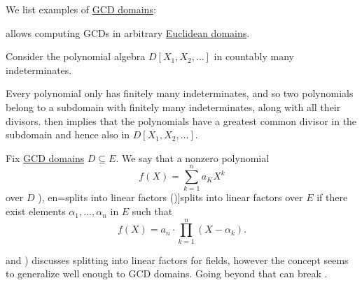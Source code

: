 \begin{example}\label{ex:def:gcd_domain}
  We list examples of \hyperref[def:gcd_domain]{GCD domains}:
  \begin{thmenum}
      allows computing GCDs in arbitrary \hyperref[def:euclidean_domain]{Euclidean domains}.

     Consider the polynomial algebra \( D[X_1, X_2, \ldots] \) in countably many indeterminates.

    Every polynomial only has finitely many indeterminates, and so two polynomials belong to a subdomain with finitely many indeterminates, along with all their divisors.  then implies that the polynomials have a greatest common divisor in the subdomain and hence also in \( D[X_1, X_2, \ldots] \).
  \end{thmenum}
\end{example}

\begin{definition}\label{def:polynomial_splits_into_linear_factors}\mimprovised
  Fix \hyperref[def:gcd_domain]{GCD domains} \( D \subseteq E \). We say that a nonzero polynomial
  \begin{equation*}
    f(X) = \sum_{k=1}^n a_K X^k
  \end{equation*}
  over \( D \) \term[ru=разлагается на линейные множители (\cite[\S 17.6]{Тыртышников2007ЛинейнаяАлгебра}), en=splits into linear factors (\cite[235]{Lang2002Algebra})]{splits into linear factors} over \( E \) if there exist elements \( \alpha_1, \ldots, \alpha_n \) in \( E \) such that
  \begin{equation}\label{eq:def:polynomial_splits_into_linear_factors}
    f(X) = a_n \cdot \prod_{k=1}^n (X - \alpha_k).
  \end{equation}
\end{definition}
\begin{comments}
  \item \Textcite[235]{Lang2002Algebra} and \textcite[\S 17.6]{Тыртышников2007ЛинейнаяАлгебра}) discusses splitting into linear factors for fields, however the concept seems to generalize well enough to GCD domains. Going beyond that can break .
\end{comments}

